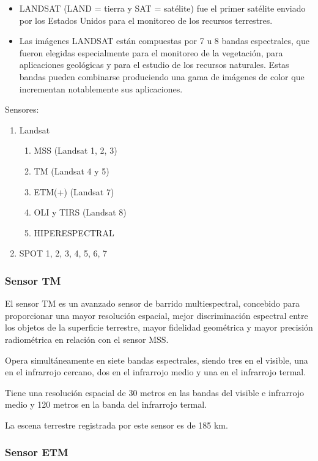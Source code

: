 \begin{itemize}
  \item LANDSAT (LAND = tierra y SAT = satélite) fue el primer satélite enviado por los Estados Unidos para el monitoreo de los recursos terrestres. 
  \item Las imágenes LANDSAT están compuestas por 7 u 8 bandas espectrales, que fueron elegidas especialmente para el monitoreo de la vegetación, para aplicaciones geológicas y para el estudio de los recursos naturales. Estas bandas pueden combinarse produciendo una gama de imágenes de color que incrementan notablemente sus aplicaciones.
\end{itemize}

Sensores:
\begin{enumerate}
  \item Landsat \begin{enumerate}
    \item MSS (Landsat 1, 2, 3)
    \item TM (Landsat 4 y 5)
    \item ETM(+) (Landsat 7)
    \item OLI y TIRS (Landsat 8)
    \item HIPERESPECTRAL 
  \end{enumerate}
  \item SPOT 1, 2, 3, 4, 5, 6, 7
\end{enumerate}

\subsubsection{Sensor TM}

El sensor TM es un avanzado sensor de barrido multiespectral, concebido para proporcionar una mayor resolución espacial, mejor discriminación espectral entre los objetos de la superficie terrestre, mayor fidelidad geométrica y mayor precisión radiométrica en relación con el sensor MSS.

Opera simultáneamente en siete bandas espectrales, siendo tres en el visible, una en el infrarrojo cercano, dos en el infrarrojo medio y una en el infrarrojo termal.

Tiene una resolución espacial de 30 metros en las bandas del visible e infrarrojo medio y 120 metros en la banda del infrarrojo termal.

La escena terrestre registrada por este sensor es de 185 km.

\subsubsection{Sensor ETM}

